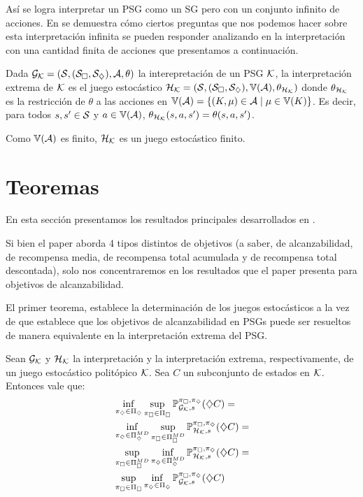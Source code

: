 Así se logra interpretar un PSG como un SG pero con un conjunto infinito de
acciones. En \cite{Polytopal} se demuestra cómo ciertos preguntas que nos
podemos hacer sobre esta interpretación infinita se pueden responder analizando
en la interpretación con una cantidad finita de acciones que presentamos a
continuación.

\begin{definition}
	Dada $\mathcal{G}_{\mathcal{K}} = (\mathcal{S}, (\mathcal{S}_\square, \mathcal{S}_\diamondsuit), \mathcal{A}, \theta)$ la interepretación de un PSG $\mathcal{K}$, la interpretación extrema de $\mathcal{K}$ es el juego estocástico $\mathcal{H}_{\mathcal{K}} = (\mathcal{S}, (\mathcal{S}_\square, \mathcal{S}_\diamondsuit), \mathbb{V}(\mathcal{A}), \theta_{\mathcal{H}_{\mathcal{K}}})$ donde $\theta_{\mathcal{H}_{\mathcal{K}}}$ es la restricción de  $\theta$ a las acciones en $\mathbb{V}(\mathcal{A}) = \{(K, \mu) \in \mathcal{A} \mid \mu \in \mathbb{V}(K)\}$. Es decir, para todos $s, s' \in \mathcal{S}$ y $a \in \mathbb{V}(\mathcal{A})$, $\theta_{\mathcal{H}_{\mathcal{K}}}(s, a, s') = \theta(s, a, s')$.

	Como $\mathbb{V}(\mathcal{A})$ es finito, $\mathcal{H}_{\mathcal{K}}$ es un juego estocástico finito.
\end{definition}

\section{Teoremas}

En esta sección presentamos los resultados principales desarrollados en
\cite{Polytopal}.

Si bien el paper aborda 4 tipos distintos de objetivos (a saber, de
alcanzabilidad, de recompensa media, de recompensa total acumulada y de
recompensa total descontada), solo nos concentraremos en los resultados que el
paper presenta para objetivos de alcanzabilidad.

El primer teorema, establece la determinación de los juegos estocásticos a la
vez de que establece que los objetivos de alcanzabilidad en PSGs puede ser
resueltos de manera equivalente en la interpretación extrema del PSG.

\begin{theorem}
	Sean $\mathcal{G}_{\mathcal{K}}$ y $\mathcal{H}_{\mathcal{K}}$ la interpretación y la interpretación extrema, respectivamente, de un juego estocástico politópico $\mathcal{K}$. Sea $C$ un subconjunto de estados en $\mathcal{K}$. Entonces vale que:
	\begin{align*}
		&\inf_{\pi_\diamondsuit \in \Pi_\diamondsuit} \sup_{\pi_\square \in \Pi_\square} \mathbb{P}_{\mathcal{G}_{\mathcal{K}}, s}^{\pi_\square, \pi_\diamondsuit}(\diamondsuit C) = \\
		&\inf_{\pi_\diamondsuit \in \Pi_\diamondsuit^{MD}} \sup_{\pi_\square \in \Pi_\square^{MD}} \mathbb{P}_{\mathcal{H}_{\mathcal{K}}, s}^{\pi_\square, \pi_\diamondsuit}(\diamondsuit C) = \\
		&\sup_{\pi_\square \in \Pi_\square^{MD}} \inf_{\pi_\diamondsuit \in \Pi_\diamondsuit^{MD}} \mathbb{P}_{\mathcal{H}_{\mathcal{K}}, s}^{\pi_\square, \pi_\diamondsuit}(\diamondsuit C) = \\
		&\sup_{\pi_\square \in \Pi_\square} \inf_{\pi_\diamondsuit \in \Pi_\diamondsuit} \mathbb{P}_{\mathcal{G}_{\mathcal{K}}, s}^{\pi_\square, \pi_\diamondsuit}(\diamondsuit C)
	\end{align*}
\end{theorem}

